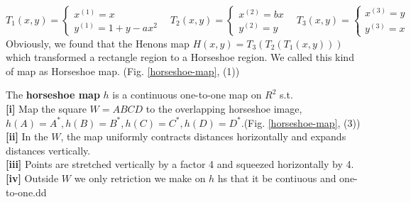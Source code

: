 \documentclass[12pt]{article}
\theoremstyle{plain}
\begin{document}
$$
T_1(x, y) = 
\left\{\begin{array}{ll}
    x^{(1)} = x \\
    y^{(1)} = 1 + y - ax^2
\end{array}\right.
\ \ \ \ 
T_2(x, y) = 
\left\{\begin{array}{ll}
    x^{(2)} = bx \\
    y^{(2)} = y
\end{array}\right.
\ \ \ \ 
T_3(x, y) = 
\left\{\begin{array}{ll}
    x^{(3)} = y \\
    y^{(3)} = x
\end{array}\right.
$$
Obviously, we found that the Henons map $H(x, y) = T_3(T_2(T_1(x, y)))$ which transformed a rectangle region to a Horseshoe region. We called this kind of map as Horseshoe map. (Fig. \ref{horseshoe-map}, (1))

The \textbf{horseshoe map} $h$ is a continuous one-to-one map on $R^2$ s.t.
\\\noindent \textbf{[i]} Map the square $W = ABCD$ to the overlapping horseshoe image, $h(A) = A^*, h(B) = B^*, h(C) = C^*, h(D) = D^*$.(Fig. \ref{horseshoe-map}, (3))
\\\noindent \textbf{[ii]} In the $W$, the map uniformly contracts distances horizontally and expands distances vertically.
\\\noindent \textbf{[iii]} Points are stretched vertically by a factor 4 and squeezed horizontally by 4.
\\\noindent \textbf{[iv]} Outside $W$ we only retriction we make on $h$ hs that it be contiuous and one-to-one.dd\\[6ex]
\end{document}
